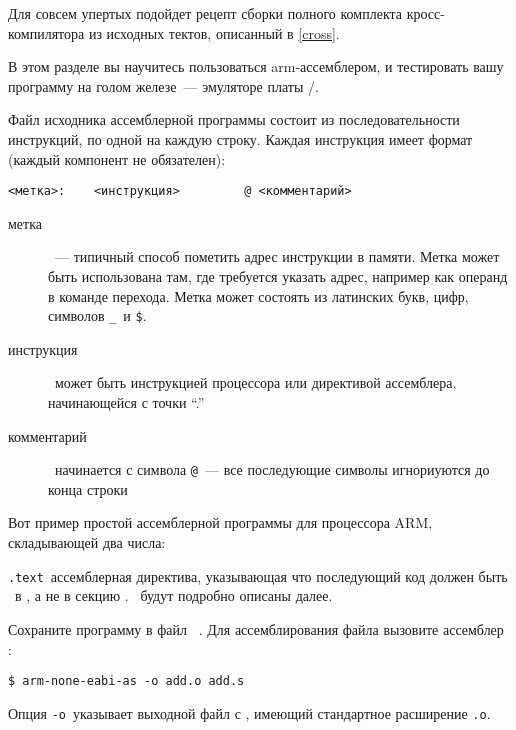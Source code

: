 Для совсем упертых подойдет рецепт сборки полного комплекта кросс-компилятора из
исходных тектов, описанный в \ref{cross}.

\secup
{}\secdown

В этом разделе вы научитесь пользоваться arm-ассемблером, и тестировать вашу
программу на голом железе\ --- эмуляторе платы /\qemu.

Файл исходника ассемблерной программы состоит из последовательности инструкций,
по одной на каждую строку. Каждая инструкция имеет формат (каждый
компонент не обязателен):

\begin{verbatim}
<метка>:    <инструкция>         @ <комментарий>
\end{verbatim}

\begin{description}
\item[метка]\ --- типичный способ пометить адрес инструкции в памяти. Метка
может быть использована там, где требуется указать адрес, например как операнд
в команде перехода. Метка может состоять из латинских букв, цифр, символов \verb|_|\ и \verb|$|.
\item[инструкция]\ может быть инструкцией процессора или директивой ассемблера,
начинающейся с точки ``.''
\item[комментарий]\ начинается с символа \verb|@|\ --- все последующие символы
игнориуются до конца строки
\end{description}

Вот пример простой ассемблерной программы для процессора ARM, складывающей
два числа:


\verb|.text|\ ассемблерная директива, указывающая что последующий код должен
быть \ в , а не в секцию
. \ будут подробно описаны далее.


Сохраните программу в файл \ .
Для ассемблирования файла вызовите ассемблер :

\begin{verbatim}
$ arm-none-eabi-as -o add.o add.s
\end{verbatim}

Опция \verb|-o|\ указывает выходной файл с , имеющий стандартное расширение \verb|.o|.

